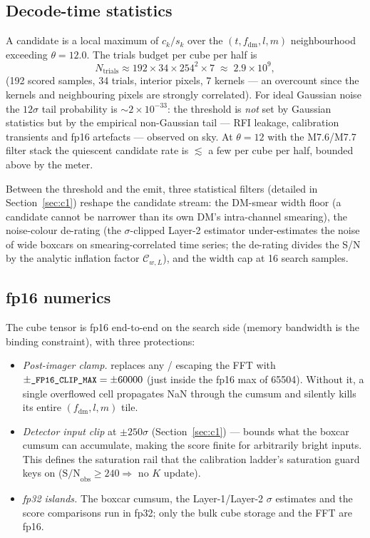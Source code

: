 \documentclass[11pt,a4paper]{article}
\newcommand{\codeword}[1]{\text{\ttfamily\small\detokenize{#1}}}
\begin{document}
\subsection{Decode-time statistics}

A candidate is a local maximum of $c_k/s_k$ over the
$(t, f_\mathrm{dm}, l, m)$ neighbourhood exceeding
$\theta = 12.0$.  The trials budget per cube per half is
\[
   N_\mathrm{trials} \approx
   192 \times 34 \times 254^2 \times 7
   \;\approx\; 2.9\times 10^{9},
\]
(192 scored samples, 34 trials, interior pixels, 7 kernels --- an
overcount since the kernels and neighbouring pixels are strongly
correlated).  For ideal Gaussian noise the $12\sigma$ tail
probability is $\sim\!2\times10^{-33}$: the threshold is \emph{not}
set by Gaussian statistics but by the empirical non-Gaussian tail
--- RFI leakage, calibration transients and fp16 artefacts ---
observed on sky.  At $\theta=12$ with the M7.6/M7.7 filter stack the
quiescent candidate rate is $\lesssim$ a few per cube per half,
bounded above by the \codeword{max_candidates_per_block=8} meter.

Between the threshold and the emit, three statistical filters
(detailed in Section~\ref{sec:c1}) reshape the candidate stream: the
DM-smear width floor (a candidate cannot be narrower than its own
DM's intra-channel smearing), the noise-colour de-rating (the
$\sigma$-clipped Layer-2 estimator under-estimates the noise of wide
boxcars on smearing-correlated time series; the de-rating divides
the S/N by the analytic inflation factor $\mathcal C_{w,L}$), and
the width cap at 16 search samples.

\subsection{fp16 numerics}

The cube tensor is fp16 end-to-end on the search side (memory
bandwidth is the binding constraint), with three protections:

\begin{itemize}[topsep=2pt,itemsep=2pt]
\item \emph{Post-imager clamp.}  \codeword{nan_to_num} replaces any
      \codeword{inf}/\codeword{NaN} escaping the FFT with
      $\pm\codeword{_FP16_CLIP_MAX} = \pm 60000$ (just inside the
      fp16 max of 65504).  Without it, a single overflowed cell
      propagates NaN through the cumsum and silently kills its
      entire $(f_\mathrm{dm}, l, m)$ tile.
\item \emph{Detector input clip} at $\pm 250\sigma$
      (Section~\ref{sec:c1}) --- bounds what the boxcar cumsum can
      accumulate, making the score finite for arbitrarily bright
      inputs.  This defines the saturation rail that the
      calibration ladder's saturation guard keys on
      ($\mathrm{S/N}_\mathrm{obs} \ge 240 \Rightarrow$ no $K$
      update).
\item \emph{fp32 islands.}  The boxcar cumsum, the Layer-1/Layer-2
      $\sigma$ estimates and the score comparisons run in fp32;
      only the bulk cube storage and the FFT are fp16.
\end{itemize}
\end{document}
